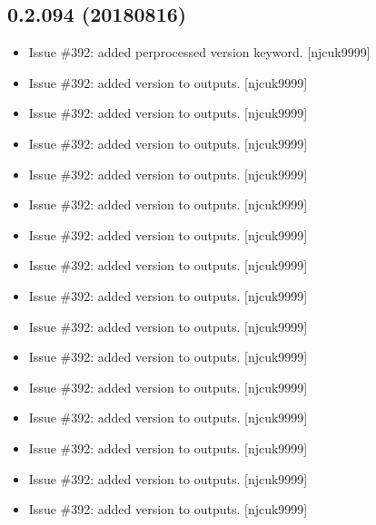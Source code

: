 \documentclass[a4paper,10pt,english]{report}
\begin{document}
\subsection{0.2.094 (2018\sphinxhyphen{}08\sphinxhyphen{}16)}
\label{\detokenize{misc/changelog:id385}}\begin{itemize}
\item {} 
Issue \#392: added per\sphinxhyphen{}processed version keyword. {[}njcuk9999{]}

\item {} 
Issue \#392: added version to outputs. {[}njcuk9999{]}

\item {} 
Issue \#392: added version to outputs. {[}njcuk9999{]}

\item {} 
Issue \#392: added version to outputs. {[}njcuk9999{]}

\item {} 
Issue \#392: added version to outputs. {[}njcuk9999{]}

\item {} 
Issue \#392: added version to outputs. {[}njcuk9999{]}

\item {} 
Issue \#392: added version to outputs. {[}njcuk9999{]}

\item {} 
Issue \#392: added version to outputs. {[}njcuk9999{]}

\item {} 
Issue \#392: added version to outputs. {[}njcuk9999{]}

\item {} 
Issue \#392: added version to outputs. {[}njcuk9999{]}

\item {} 
Issue \#392: added version to outputs. {[}njcuk9999{]}

\item {} 
Issue \#392: added version to outputs. {[}njcuk9999{]}

\item {} 
Issue \#392: added version to outputs. {[}njcuk9999{]}

\item {} 
Issue \#392: added version to outputs. {[}njcuk9999{]}

\item {} 
Issue \#392: added version to outputs. {[}njcuk9999{]}

\item {} 
Issue \#392: added version to outputs. {[}njcuk9999{]}


\end{itemize}
\end{document}
